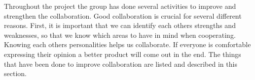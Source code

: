 
Throughout the project the group has done several activities to improve and strengthen the collaboration. 
Good collaboration is crucial for several different reasons. 
First, it is important that we can identify each others strengths and weaknesses, so that we know which areas to have in mind when cooperating. 
Knowing each others personalities helps us collaborate. 
If everyone is comfortable expressing their opinion a better product will come out in the end. The things that have been done to improve collaboration are listed and described in this section. 